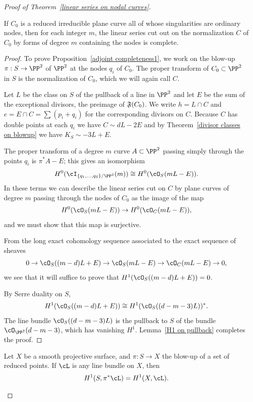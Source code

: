 \begin{proof}[Proof of Theorem~\ref{linear series on nodal curves}]
\begin{proposition}\label{adjoint completeness1}
If $C_{0}$ is a reduced irreducible plane curve all of whose singularities are ordinary nodes, then for each
integer $m$,
the linear series cut out on the normalization $C$ of $C_{0}$ by forms of degree $m$ containing the nodes
is complete.
\end{proposition}

\begin{proof}
To prove Proposition~\ref{adjoint completeness1}, we work on the blow-up $\pi : S \to \PP^2$ of $\PP^2$ at the nodes $q_i$ of $C_0$. The proper transform of $C_0 \subset \PP^2$ in $S$ is the normalization of $C_0$, which we will again call $C$.

Let $L$ be the class on $S$ of the pullback of a line in $\PP^2$  and let $E$ be the sum of the exceptional divisors, the preimage of $\adj(C_{0})$. We write $h= L\cap C$ and $e = E\cap C= \sum (p_i+q_i)$ for the corresponding divisors on $C$. 
Because $C$ has double points at each $q_{i}$ we have
$
C \sim dL - 2E 
$
and   by
Theorem~\ref{divisor classes on blowup} we have $K_S \sim -3L + E$.

The proper transform of a degree $m$ curve $A\subset \PP^2$  passing simply through the points $q_i$
is $\pi^*A - E$; this gives an isomorphism
$$
H^0(\cI_{\{q_1,\dots,q_\delta\}/\PP^2}(m)) \cong H^0(\cO_S(mL-E)).
$$
In these terms we can describe the linear series cut on $C$ by plane curves of degree $m$ passing through the nodes of $C_0$ as the image of the map
$$
H^0(\cO_S(mL-E)) \to H^0(\cO_C(mL-E)),
$$
and we must show that this map is surjective.

From the long exact cohomology sequence associated to the exact sequence of sheaves
$$
0 \to \cO_S((m-d)L + E)  \to \cO_S(mL-E) \to \cO_C(mL-E) \to 0,
$$
 we see that it will suffice to prove that $H^1(\cO_S((m-d)L + E)) = 0$. 
 
By Serre duality on $S$,
$$
H^1(\cO_S((m-d)L + E)) \cong H^1(\cO_S((d-m-3)L))^*.
$$
The line bundle $\cO_S((d-m-3)L)$ is 
 the pullback to $S$ of the bundle $\cO_{\PP^2}(d-m-3)$, which has vanishing $H^1$. Lemma~\ref{H1 on pullback} completes the proof.
\end{proof}

\begin{lemma}\label{H1 on pullback}
Let $X$ be a smooth projective surface, and $\pi : S \to X$ the blow-up of a set of reduced points. If $\cL$ is any line bundle on $X$, then
$$
H^1(S, \pi^*\cL) = H^1(X, \cL).
$$
\end{lemma}


\end{proof}
